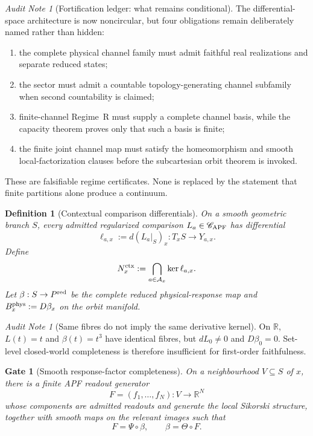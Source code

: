 \documentclass[11pt]{article}
\newtheorem{definition}[theorem]{Definition}
\newtheorem{gate}[theorem]{Gate}
\theoremstyle{remark}
\newtheorem{audit}[theorem]{Audit Note}
\begin{document}
\begin{audit}[Fortification ledger: what remains conditional]
The differential-space architecture is now noncircular, but four obligations
remain deliberately named rather than hidden:
\begin{enumerate}[label=(\roman*)]
\item the complete physical channel family must admit faithful real
realizations and separate reduced states;
\item the sector must admit a countable topology-generating channel subfamily
when second countability is claimed;
\item finite-channel Regime~R must supply a complete channel basis, while the
capacity theorem proves only that such a basis is finite;
\item the finite joint channel map must satisfy the homeomorphism and smooth
local-factorization clauses before the subcartesian orbit theorem is invoked.
\end{enumerate}
These are falsifiable regime certificates.  None is replaced by the statement
that finite partitions alone produce a continuum.
\end{audit}

\begin{definition}[Contextual comparison differentials]
\label{def:contextual-comparison-differentials}
On a smooth geometric branch $S$, every admitted regularized comparison
$L_a\in\mathscr C_{\rm APF}$ has differential
\[
        \ell_{a,x}:=d(L_a|_S)_x:T_xS\to Y_{a,x}.
\]
Define
\[
        N_x^{\rm ctx}:=\bigcap_{a\in\mathcal A_x}\ker\ell_{a,x}.
\]
Let $\beta:S\to P^{\rm red}$ be the complete reduced physical-response map and
$B_x^{\rm phys}:=D\beta_x$ on the orbit manifold.
\end{definition}

\begin{audit}[Same fibres do not imply the same derivative kernel]
On $\mathbb R$, $L(t)=t$ and $\beta(t)=t^3$ have identical fibres, but
$dL_0\neq0$ and $D\beta_0=0$.  Set-level closed-world completeness is therefore
insufficient for first-order faithfulness.
\end{audit}

\begin{gate}[Smooth response-factor completeness]
\label{gate:smooth-response-factor-completeness}
On a neighbourhood $V\subseteq S$ of $x$, there is a finite APF readout
generator
\[
F=(f_1,\ldots,f_N):V\to\mathbb R^N
\]
whose components are admitted readouts and generate the local Sikorski
structure, together with smooth maps on the relevant images such that
\[
F=\Psi\circ\beta,
\qquad
\beta=\Theta\circ F.
\]
\end{gate}
\end{document}
